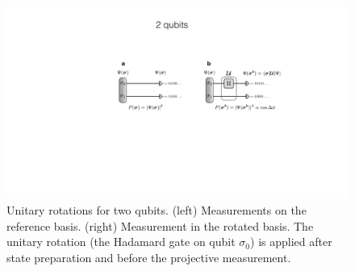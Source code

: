 \documentclass[submission, Phys, hidelnks]{SciPost}
\begin{document}
\begin{figure}[htb]
    \centering
    \includegraphics[width=\columnwidth, trim={0 0 0 40}, clip]{2qubits_rotation}
    \caption{Unitary rotations for two qubits. (left) Measurements on the reference basis. (right) Measurement in the rotated basis. The unitary rotation (the Hadamard gate on qubit $\sigma_0$) is applied after state preparation and before the projective measurement.}
    \label{phase_learn} 
\end{figure}
\end{document}
